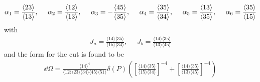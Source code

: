 \documentclass[letter,11pt]{article}
\newcommand{\ab}[1]{\langle #1 \rangle}
\begin{document}
\begin{equation}
	\begin{aligned}
		&\alpha_1=\frac{\expval{23}}{\expval{13}},~~~~
		\alpha_2=\frac{\expval{12}}{\expval{13}},~~~~
		\alpha_3=-\frac{\expval{45}}{\expval{35}},~~~~
		\alpha_4=\frac{\expval{35}}{\expval{34}},~~~~
		\alpha_5=\frac{\expval{13}}{\expval{35}},~~~~
		\alpha_6=\frac{\expval{35}}{\expval{15}}\\
		\end{aligned}
\end{equation}
with 
\begin{equation}
	\begin{aligned}
		J_a=\frac{\ab{14}\ab{35}}{\ab{15}\ab{34}},~~~~~~J_b=\frac{\ab{14}\ab{35}}{\ab{13}\ab{45}}
	\end{aligned}
\end{equation}
and the form for the cut is found to be
\begin{equation}
	\begin{aligned}
		\dd \Omega
		=\frac{\ab{14}^4}{\ab{12}\ab{23}\ab{34}\ab{45}\ab{51}}\delta(P)\left(\left[\frac{\ab{14}\ab{35}}{\ab{15}\ab{34}}\right]^{-4}+\left[\frac{\ab{14}\ab{35}}{\ab{13}\ab{45}}\right]^{-4}\right)
	\end{aligned}
\end{equation}
\end{document}
